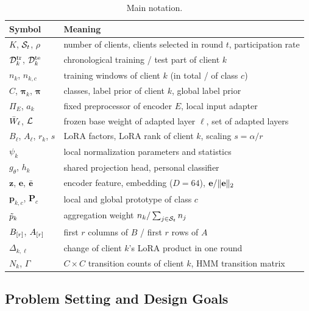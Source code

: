 \begin{table}[!t]
\centering
\caption{Main notation.}
\label{tab:notation}
\footnotesize
\renewcommand{\arraystretch}{1.08}
\begin{tabularx}{\columnwidth}{@{}l Y@{}}
\toprule
Symbol & Meaning \\
\midrule
$K$, $\mathcal{S}_t$, $\rho$ & number of clients, clients selected in round $t$, participation rate \\
$\mathcal{D}_k^{\mathrm{tr}}$, $\mathcal{D}_k^{\mathrm{te}}$ & chronological training / test part of client $k$ \\
$n_k$, $n_{k,c}$ & training windows of client $k$ (in total / of class $c$) \\
$C$, $\boldsymbol{\pi}_k$, $\boldsymbol{\pi}$ & classes, label prior of client $k$, global label prior \\
$\Pi_E$, $a_k$ & fixed preprocessor of encoder $E$, local input adapter \\
$\bar{W}_\ell$, $\mathcal{L}$ & frozen base weight of adapted layer $\ell$, set of adapted layers \\
$B_\ell$, $A_\ell$, $r_k$, $s$ & LoRA factors, LoRA rank of client $k$, scaling $s=\alpha/r$ \\
$\psi_k$ & local normalization parameters and statistics \\
$g_\theta$, $h_k$ & shared projection head, personal classifier \\
$\mathbf{z}$, $\mathbf{e}$, $\bar{\mathbf{e}}$ & encoder feature, embedding ($D=64$), $\mathbf{e}/\lVert \mathbf{e}\rVert_2$ \\
$\mathbf{p}_{k,c}$, $\mathbf{P}_c$ & local and global prototype of class $c$ \\
$\tilde{p}_k$ & aggregation weight $n_k/\sum_{j\in\mathcal{S}_t}n_j$ \\
$B_{[r]}$, $A_{[r]}$ & first $r$ columns of $B$ / first $r$ rows of $A$ \\
$\Delta_{k,\ell}$ & change of client $k$'s LoRA product in one round \\
$N_k$, $\Gamma$ & $C\times C$ transition counts of client $k$, HMM transition matrix \\
\bottomrule
\end{tabularx}
\end{table}

\subsection{Problem Setting and Design Goals}\label{sec:method:problem}


